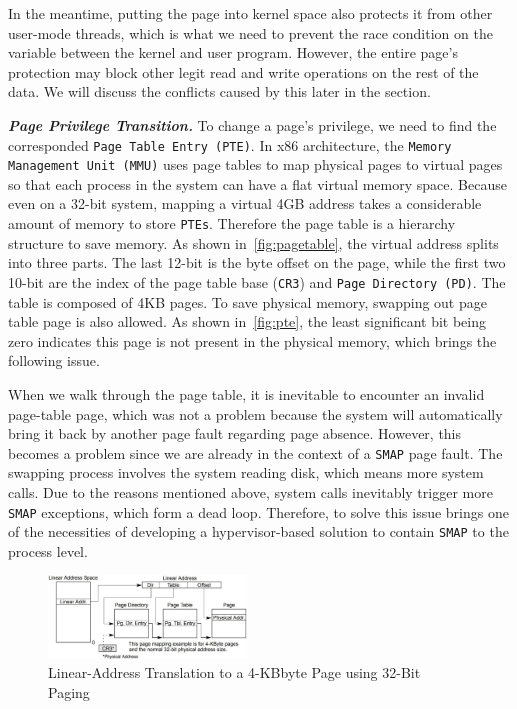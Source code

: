In the meantime, putting the page into kernel space also protects it from other user-mode threads, which is what we need to prevent the race condition on the variable between the kernel and user program. However, the entire page's protection may block other legit read and write operations on the rest of the data. We will discuss the conflicts caused by this later in the section.



\textbf{\textit{Page Privilege Transition.}} To change a page's privilege, we need to find the corresponded \texttt{Page Table Entry (PTE)}.  In x86 architecture, the \texttt{Memory Management Unit (MMU)} uses page tables to map physical pages to virtual pages~\cite{intelpaging} so that each process in the system can have a flat virtual memory space. Because even on a 32-bit system, mapping a virtual 4GB address takes a considerable amount of memory to store \texttt{PTEs}. Therefore the page table is a hierarchy structure to save memory. As shown in~\autoref{fig:pagetable}, the virtual address splits into three parts. The last 12-bit is the byte offset on the page, while the first two 10-bit are the index of the page table base (\texttt{CR3}) and \texttt{Page Directory (PD)}. The table is composed of 4KB pages. To save physical memory, swapping out page table page is also allowed. As shown in~\autoref{fig:pte}, the least significant bit being zero indicates this page is not present in the physical memory, which brings the following issue. 

When we walk through the page table, it is inevitable to encounter an invalid page-table page, which was not a problem because the system will automatically bring it back by another page fault regarding page absence. However, this becomes a problem since we are already in the context of a \texttt{SMAP} page fault. The swapping process involves the system reading disk, which means more system calls. Due to the reasons mentioned above, system calls inevitably trigger more \texttt{SMAP} exceptions, which form a dead loop. Therefore, to solve this issue brings one of the necessities of developing a hypervisor-based solution to contain \texttt{SMAP} to the process level. 



\begin{figure}[th]
  \includegraphics[width=0.47\textwidth]{figures/pagetable}
  \centering
  \caption{Linear-Address Translation to a 4-KBbyte Page using 32-Bit Paging~\cite{guide2011intel}}
  \label{fig:pagetable}
\end{figure}

